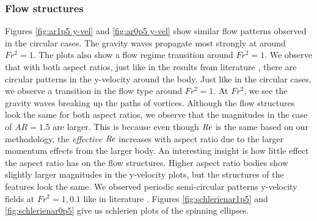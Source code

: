 \subsubsection{Flow structures}
Figures \ref{fig:ar1p5 y-vel} and \ref{fig:ar0p5 y-vel} show similar flow patterns observed in the circular cases. The gravity waves propagate most strongly at around $Fr^2 = 1$. The plots also show a flow regime transition around $Fr^2 = 1$. We observe that with both aspect ratios, just like in the results from literature \cite{ortiz-tarin_stratified_2019}, there are circular patterns in the y-velocity around the body. Just like in the circular cases, we observe a transition in the flow type around $Fr^2 = 1$. At $Fr^2$, we see the gravity waves breaking up the paths of vortices.  Although the flow structures look the same for both aspect ratios, we observe that the magnitudes in the case of $AR = 1.5$ are larger. This is because even though $\mathit{Re}$ is the same based on our methodology, the \textit{effective} $\mathit{Re}$ increases with aspect ratio due to the larger momentum effects from the larger body. An interesting insight is how little effect the aspect ratio has on the flow structures. Higher aspect ratio bodies show slightly larger magnitudes in the y-velocity plots, but the structures of the features look the same. We observed periodic semi-circular patterns y-velocity fields at $Fr^2 = 1, 0.1$ like in literature \cite{ortiz-tarin_stratified_2019}. Figures \ref{fig:schlerienar1p5} and \ref{fig:schlerienar0p5} give us schlerien plots of the spinning ellipses. 
